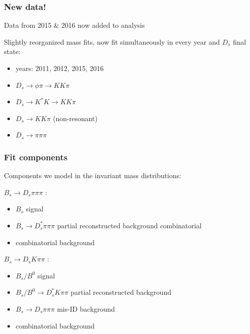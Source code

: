 \documentclass[]{beamer}
\begin{document}
\begin{frame}
\frametitle{New data!}

Data from 2015 \& 2016 now added to analysis \newline

Slightly reorganized mass fits, now fit simultaneously in every year and $D_{s}$ final state:

\begin{itemize} 

\item years: 2011, 2012, 2015, 2016

\item $D_{s}\to \phi\pi \to KK\pi$

\item $D_{s}\to K^{*}K \to KK\pi$

\item $D_{s} \to KK\pi$ (non-resonant)

\item $D_{s} \to \pi\pi\pi$

\end{itemize}

\end{frame}

\begin{frame}
\frametitle{Fit components}

Components we model in the invariant mass distributions:\newline

$B_{s}\to D_{s}\pi\pi\pi$ :

\begin{itemize}

 \item $B_{s}$ signal

 \item  $B_{s}\to D_{s}^{*}\pi\pi\pi$ partial reconstructed background combinatorial

\item combinatorial background

\end{itemize}



$B_{s}\to D_{s}K\pi\pi$ :

\begin{itemize}

\item $B_{s}/B^{0}$ signal

\item  $B_{s}/B^{0}\to D_{s}^{*}K\pi\pi$ partial reconstructed background

\item  $B_{s}\to D_{s}\pi\pi\pi$ mis-ID background

\item combinatorial background 

\end{itemize}


\end{frame}
\end{document}
